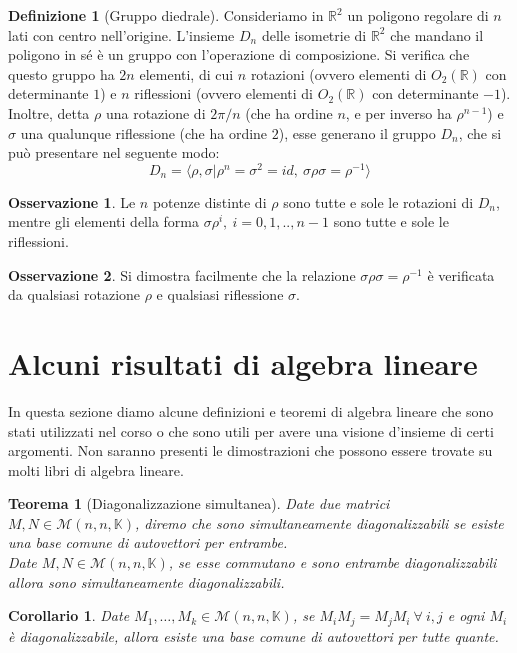 \documentclass[11pt]{article}
\theoremstyle{plain}
\newtheorem{thm}{Teorema}[section]
\newtheorem*{cor}{Corollario}
\theoremstyle{definition}
\newtheorem{defn}{Definizione}[section]
\newtheorem*{rem}{Osservazione}
\theoremstyle{remark}
\newcommand{\R}{\mathbb{R}}
\newcommand{\K}{\mathbb{K}}
\begin{document}
\begin{defn}[Gruppo diedrale]
Consideriamo in $\R^2$ un poligono regolare di $n$ lati con centro nell'origine.
L'insieme $D_n$ delle isometrie di $\R^2$ che mandano il poligono in sé è un gruppo con l'operazione di composizione.
Si verifica che questo gruppo ha $2n$ elementi, di cui $n$ rotazioni (ovvero elementi di $O_2(\R)$ con determinante $1$)
e $n$ riflessioni (ovvero elementi di $O_2(\R)$ con determinante $-1$).
Inoltre, detta $\rho$ una rotazione di $2\pi/n$ (che ha ordine $n$, e per inverso ha $\rho^{n-1}$) e $\sigma$ una qualunque riflessione (che ha ordine $2$), esse generano
il gruppo $D_n$, che si può presentare nel seguente modo: $$D_n=\langle\rho,\sigma|\rho^n=\sigma^2=id,\ \sigma\rho\sigma=\rho^{-1}\rangle$$
\end{defn}

\begin{rem}
 Le $n$ potenze distinte di $\rho$ sono tutte e sole le rotazioni di $D_n$, mentre gli elementi della forma $\sigma\rho^{i},\ i=0,1,..,n-1$
 sono tutte e sole le riflessioni.
\end{rem}

\begin{rem}
 Si dimostra facilmente che la relazione $\sigma\rho\sigma=\rho^{-1}$ è verificata da qualsiasi rotazione $\rho$
 e qualsiasi riflessione $\sigma$.
\end{rem}











\newpage
\section{Alcuni risultati di algebra lineare}
In questa sezione diamo alcune definizioni e teoremi di algebra lineare che sono stati utilizzati nel corso o che sono utili per avere una visione d'insieme di certi argomenti. Non saranno presenti le dimostrazioni che possono essere trovate su molti libri di algebra lineare.
\begin{thm}[Diagonalizzazione simultanea]
\label{thm:diag_sim}
	Date due matrici $M, N\in \mathcal{M}(n,n,\K)$, diremo che sono \textit{simultaneamente diagonalizzabili} se esiste una base comune di autovettori per entrambe.\\
	Date $M, N\in \mathcal{M}(n,n,\K)$, se esse commutano e sono entrambe diagonalizzabili allora sono simultaneamente diagonalizzabili.
\end{thm}
\begin{cor}
	Date $M_1,\ldots,M_k \in \mathcal{M}(n,n,\K)$, se $M_iM_j=M_jM_i\ \forall\ i, j$ e ogni $M_i$ è diagonalizzabile, allora esiste una base comune di autovettori per tutte quante.
\end{cor}
\end{document}
